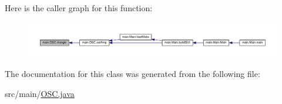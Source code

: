 Here is the caller graph for this function\+:
\nopagebreak
\begin{figure}[H]
\begin{center}
\leavevmode
\includegraphics[width=350pt]{classmain_1_1_o_s_c_afe21605a56d6899ae580e72ee5b4cf07_icgraph}
\end{center}
\end{figure}




The documentation for this class was generated from the following file\+:\begin{DoxyCompactItemize}
\item 
src/main/\hyperlink{_o_s_c_8java}{O\+S\+C.\+java}\end{DoxyCompactItemize}
